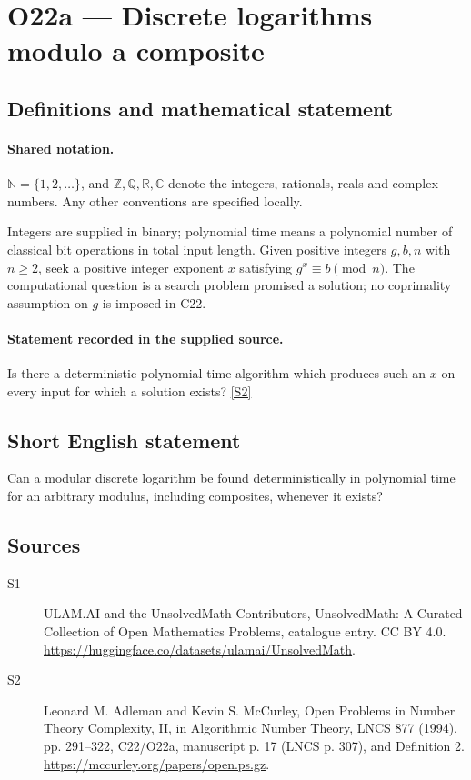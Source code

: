 \documentclass[11pt]{article}
\newcommand{\sref}[2]{\hyperlink{source:#1:#2}{[S#2]}}
\begin{document}
\section{O22a — Discrete logarithms modulo a composite}\label{statement}

\subsection{Definitions and mathematical statement}

\paragraph{Shared notation.}$\mathbb N=\{1,2,\ldots\}$, and $\mathbb Z,\mathbb Q,\mathbb R,\mathbb C$ denote the integers, rationals, reals and complex numbers. Any other conventions are specified locally.


Integers are supplied in binary; polynomial time means a polynomial number of classical bit operations in total input length. Given positive integers $g,b,n$ with $n\ge2$, seek a positive integer exponent $x$ satisfying $g^x\equiv b\pmod n$. The computational question is a search problem promised a solution; no coprimality assumption on $g$ is imposed in C22.
\paragraph{Statement recorded in the supplied source.}
Is there a deterministic polynomial-time algorithm which produces such an $x$ on every input for which a solution exists? \sref{statement}{2}
\subsection{Short English statement}
Can a modular discrete logarithm be found deterministically in polynomial time for an arbitrary modulus, including composites, whenever it exists?
\subsection{Sources}
\begin{description}
\item[\hypertarget{source:statement:1}{S1}] ULAM.AI and the UnsolvedMath Contributors, UnsolvedMath: A Curated Collection of Open Mathematics Problems, catalogue entry. CC BY 4.0. \url{https://huggingface.co/datasets/ulamai/UnsolvedMath}.
\item[\hypertarget{source:statement:2}{S2}] Leonard M. Adleman and Kevin S. McCurley, Open Problems in Number Theory Complexity, II, in Algorithmic Number Theory, LNCS 877 (1994), pp. 291--322, C22/O22a, manuscript p. 17 (LNCS p. 307), and Definition 2. \url{https://mccurley.org/papers/open.ps.gz}.
\end{description}
\label{end:statement}
\end{document}
